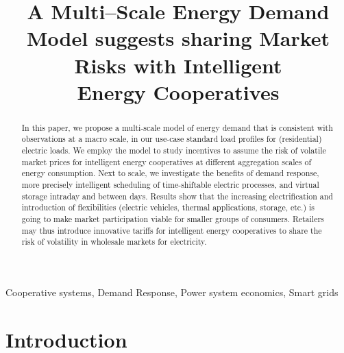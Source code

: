 \documentclass[conference]{IEEEtran}
\begin{document}
\title{A Multi--Scale Energy Demand Model suggests sharing Market Risks with Intelligent\\ Energy Cooperatives\vspace{-1em}}
\author{
}

\maketitle

\begin{abstract} In this paper, we propose a multi-scale model of energy demand that is consistent with observations at a macro scale, in our use-case standard load profiles for (residential) electric loads. We employ the model to study incentives to assume the risk of volatile market prices for intelligent energy cooperatives at different aggregation scales of energy consumption. Next to scale, we investigate the benefits of demand response, more precisely intelligent scheduling of time-shiftable electric processes, and virtual storage intraday and between days. Results show that the increasing electrification and introduction of flexibilities (electric vehicles, thermal applications, storage, etc.) is going to make market participation viable for smaller groups of consumers. Retailers may thus introduce innovative tariffs for intelligent energy cooperatives to share the risk of volatility in wholesale markets for electricity.
\end{abstract}

\begin{keywords}
Cooperative systems, Demand Response, Power system economics, Smart grids
\end{keywords}

\IEEEpeerreviewmaketitle

\section{Introduction}
\label{sec:Introduction}
\end{document}
